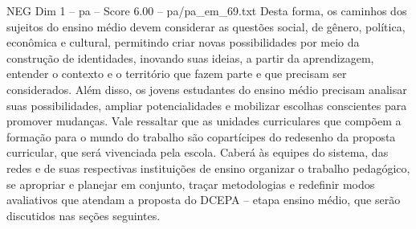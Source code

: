 \begin{textsample}{NEG Dim 1 – pa – Score 6.00 – pa/pa\_em\_69.txt}  \label{ex:f1_neg_258}
Desta forma, os caminhos dos sujeitos do ensino médio devem considerar as questões social, de gênero, política, econômica e cultural, permitindo criar novas possibilidades por meio da construção de identidades, inovando suas ideias, a partir da aprendizagem, entender o contexto e o território que fazem parte e que precisam ser considerados.
Além disso, os jovens estudantes do ensino médio precisam analisar suas possibilidades, ampliar potencialidades e mobilizar escolhas conscientes para promover mudanças.
Vale ressaltar que as unidades curriculares que compõem a formação para o mundo do trabalho são copartícipes do redesenho da proposta curricular, que será vivenciada pela escola.
Caberá às equipes do sistema, das redes e de suas respectivas instituições de ensino organizar o trabalho pedagógico, se apropriar e planejar em conjunto, traçar metodologias e redefinir modos avaliativos que atendam a proposta do DCEPA – etapa ensino médio, que serão discutidos nas seções seguintes.

\end{textsample}
